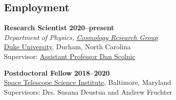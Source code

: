 \documentclass[margin]{res}
\begin{document}
\begin{resume}

\section{Employment} 

{\bf Research Scientist} \hfill {\bf 2020--present}\\
{\it Department of Physics, \href{https://phy.duke.edu/research/research-areas/astrophysics}{Cosmology Research Group}}\\
\href{https://phy.duke.edu}{Duke University}, Durham, North Carolina\\ 
Supervisor: \href{https://phy.duke.edu/people/daniel-m-scolnic}{Assistant Professor Dan Scolnic}

{\bf Postdoctoral Fellow} \hfill {\bf 2018--2020}\\
\href{http://www.stsci.edu}{Space Telescope Science Institute}, Baltimore, Maryland\\ 
Supervisors: Drs. Susana Deustua and Andrew Fruchter


 






\end{resume}
\end{document}
